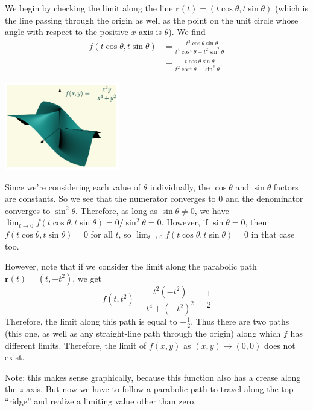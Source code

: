\documentclass[svgnames]{report}
\begin{document}
\begin{solution}
  \begin{minipage}{0.7\textwidth}
    We begin by checking the limit along the line $\mathbf{r}(t) = (t\cos
    \theta, t \sin \theta)$ (which is the line passing through the
    origin as well as the point on the unit circle whose angle with
    respect to the positive $x$-axis is $\theta$). We find
    \begin{align*}
      f(t\cos\theta, t \sin \theta) &= \frac{-t^3
                                      \cos\theta \sin \theta}{t^4 \cos^4 \theta + t^2 \sin^2 \theta} \\
                                    &= \frac{-t \cos\theta \sin \theta}{t^2 \cos^4 \theta + \sin^2
                                      \theta}. 
    \end{align*}
  \end{minipage}
  \begin{minipage}{0.29\textwidth}
  \includegraphics[width=5cm]{figures/limitparab}
\end{minipage}
Since we're considering each value of $\theta$ individually, the
  $\cos \theta$ and $\sin \theta$ factors are constants. So we see that the
  numerator converges to $0$ and the denominator converges to
  $\sin^2\theta$. Therefore, as long as $\sin \theta \neq 0$, we have
  $\lim_{t\to 0}f(t\cos\theta, t \sin \theta) = 0/\sin^2\theta =
  0$. However, if $\sin \theta = 0$, then
  $f(t\cos\theta, t \sin \theta) = 0$ for all $t$, so
  $\lim_{t\to 0}f(t\cos\theta, t \sin \theta) = 0$ in that case too.
  
  However, note that if we consider the limit along the parabolic
  path $\mathbf{r}(t) = (t, -t^2)$, we get
  \[
    f(t,t^2) = \frac{t^2(-t^2)}{t^4+(-t^2)^2} = \frac{1}{2}
  \]
  Therefore, the limit along this path is equal to
  $-\tfrac{1}{2}$. Thus there are two paths (this one, as well as
  any straight-line path through the origin) along which $f$ has
  different limits. Therefore, the limit of $f(x,y)$ as $(x,y) \to
  (0,0)$ does not exist.
  
  Note: this makes sense graphically, because this function also has a
  crease along the $z$-axis. But now we have to follow a
  parabolic path to travel along the top ``ridge'' and realize a
  limiting value other than zero.
\end{solution}
\end{document}
